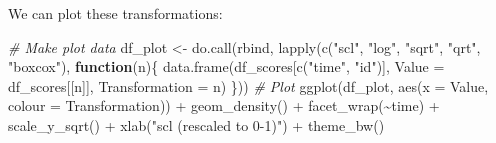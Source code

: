 \documentclass[
  man,floatsintext]{apa6}
\newenvironment{Shaded}{\begin{snugshade}}{\end{snugshade}}
\newcommand{\AttributeTok}[1]{\textcolor[rgb]{0.77,0.63,0.00}{#1}}
\newcommand{\CommentTok}[1]{\textcolor[rgb]{0.56,0.35,0.01}{\textit{#1}}}
\newcommand{\ControlFlowTok}[1]{\textcolor[rgb]{0.13,0.29,0.53}{\textbf{#1}}}
\newcommand{\DecValTok}[1]{\textcolor[rgb]{0.00,0.00,0.81}{#1}}
\newcommand{\FunctionTok}[1]{\textcolor[rgb]{0.00,0.00,0.00}{#1}}
\newcommand{\NormalTok}[1]{#1}
\newcommand{\OtherTok}[1]{\textcolor[rgb]{0.56,0.35,0.01}{#1}}
\newcommand{\SpecialCharTok}[1]{\textcolor[rgb]{0.00,0.00,0.00}{#1}}
\newcommand{\StringTok}[1]{\textcolor[rgb]{0.31,0.60,0.02}{#1}}
\begin{document}
\begin{Shaded}
\end{Shaded}

We can plot these transformations:

\begin{Shaded}
\begin{Highlighting}[]
\CommentTok{\# Make plot data}
\NormalTok{df\_plot }\OtherTok{\textless{}{-}} \FunctionTok{do.call}\NormalTok{(rbind, }\FunctionTok{lapply}\NormalTok{(}\FunctionTok{c}\NormalTok{(}\StringTok{"scl"}\NormalTok{, }\StringTok{"log"}\NormalTok{, }\StringTok{"sqrt"}\NormalTok{, }\StringTok{"qrt"}\NormalTok{, }\StringTok{"boxcox"}\NormalTok{), }\ControlFlowTok{function}\NormalTok{(n)\{}
  \FunctionTok{data.frame}\NormalTok{(df\_scores[}\FunctionTok{c}\NormalTok{(}\StringTok{"time"}\NormalTok{, }\StringTok{"id"}\NormalTok{)],}
             \AttributeTok{Value =}\NormalTok{ df\_scores[[n]],}
             \AttributeTok{Transformation =}\NormalTok{ n)}
\NormalTok{\}))}
\CommentTok{\# Plot}
\FunctionTok{ggplot}\NormalTok{(df\_plot, }\FunctionTok{aes}\NormalTok{(}\AttributeTok{x =}\NormalTok{ Value, }\AttributeTok{colour =}\NormalTok{ Transformation)) }\SpecialCharTok{+}
  \FunctionTok{geom\_density}\NormalTok{() }\SpecialCharTok{+}
  \FunctionTok{facet\_wrap}\NormalTok{(}\SpecialCharTok{\textasciitilde{}}\NormalTok{time) }\SpecialCharTok{+}
  \FunctionTok{scale\_y\_sqrt}\NormalTok{() }\SpecialCharTok{+}
  \FunctionTok{xlab}\NormalTok{(}\StringTok{"scl (rescaled to 0{-}1)"}\NormalTok{) }\SpecialCharTok{+}
  \FunctionTok{theme\_bw}\NormalTok{()}
\end{Highlighting}
\end{Shaded}
\end{document}
